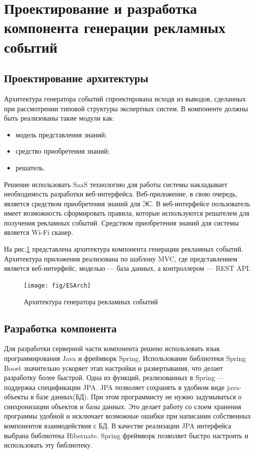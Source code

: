 \section{Проектирование и разработка компонента генерации рекламных событий}


\subsection{Проектирование архитектуры}

Архитектура генератора событий спроектирована исходя из выводов, сделанных при рассмотрении типовой структуры экспертных систем. В компоненте должны быть реализованы такие модули как:

\begin{itemize}
	\item модель представления знаний;
	\item средство приобретения знаний;
	\item решатель.
\end{itemize}

Решение использовать SaaS технологию для работы системы накладывает необходимость разработки веб-интерфейса. Веб-приложение, в свою очередь, является средством приобретения знаний для ЭС. В веб-интерфейсе пользователь имеет возможность сформировать правила, которые используются решателем для получения рекламных событий. Средством приобретения знаний для системы является Wi-Fi сканер.

На рис.\ref{fig:ESArch} представлена архитектура компонента генерации рекламных событий. Архитектура приложения реализована по шаблону MVC, где представлением является веб-интерфейс, моделью --- база данных, а контроллером --- REST API.

\begin{figure}[h]
	\centering
	\texttt{[image: fig/ESArch]}
	\caption{Архитектура генератора рекламных событий}
	\label{fig:ESArch}
\end{figure}

\subsection{Разработка компонента}

Для разработки серверной части компонента решено использовать язык программирования Java и фреймворк Spring. Использование библиотеки Spring Boost значительно ускоряет этап настройки и развертывания, что делает разработку более быстрой. Одна из функций, реализованных в Spring --- поддержка спецификации JPA. JPA позволяет сохранять в удобном виде java-объекты в базе данных(БД). При этом программисту не нужно задумываться о синхронизации объектов и базы данных. Это делает работу со слоем хранения программы удобной и исключает возможные ошибки при написании собственных компонентов взаимодействия с БД. В качестве реализации JPA интерфейса выбрана библиотека Hibernate. Spring фреймворк позволяет быстро настроить и использовать эту библиотеку.


